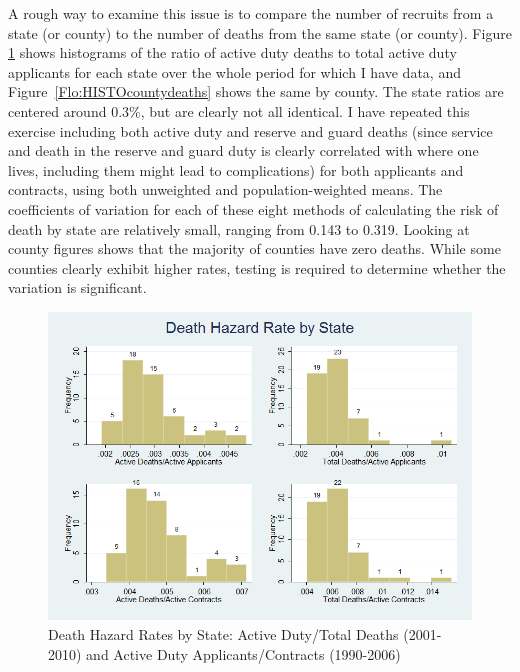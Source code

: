 \documentclass[12pt] {article}
\begin{document}
A rough way to examine this issue is to compare the number of recruits from a state (or county) to the number of deaths from the same state (or county). Figure \ref{Flo:HISTOstatedeaths} shows histograms of the ratio of active duty deaths to total active duty applicants for each state over the whole period for which I have data, and  Figure~\ref{Flo:HISTOcountydeaths} shows the same by county. The state ratios are centered around 0.3\%, but are clearly not all identical. I have repeated this exercise including both active duty and reserve and guard deaths (since service and death in the reserve and guard duty is clearly correlated with where one lives, including them might lead to complications) for both applicants and contracts, using both unweighted
and population-weighted means. The coefficients of variation for each
of these eight methods of calculating the risk of death by state are
relatively small, ranging from 0.143 to 0.319. Looking at county figures shows that the majority of counties have zero deaths. While some counties clearly exhibit higher rates, testing is required to determine whether the variation is significant. 

\begin{figure}
\includegraphics[scale=0.6]{../Output/hist_state_combined.png}
\caption{Death Hazard Rates by State: Active Duty/Total Deaths (2001-2010) and Active Duty Applicants/Contracts (1990-2006)}
\label{Flo:HISTOstatedeaths}
\end{figure}
\end{document}
